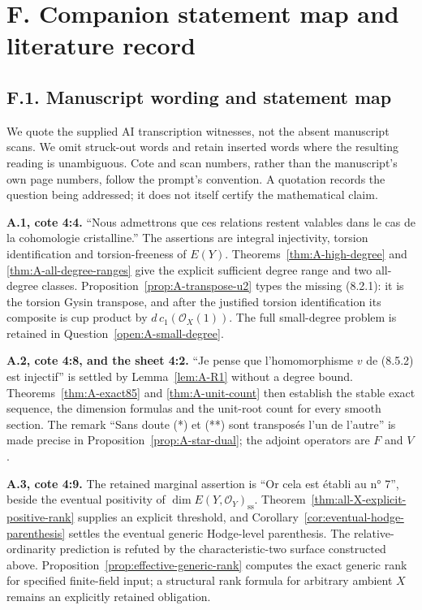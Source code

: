 \section{F. Companion statement map and literature record}
\subsection{F.1. Manuscript wording and statement map}
We quote the supplied AI transcription witnesses, not the absent manuscript
scans.  We omit struck-out words and retain inserted words where the resulting
reading is unambiguous.  Cote and scan numbers, rather than the manuscript's
own page numbers, follow the prompt's convention.  A quotation records the
question being addressed; it does not itself certify the mathematical claim.

\par\smallskip\noindent\textbf{A.1, cote 4:4.}
``Nous admettrons que ces relations restent valables dans le cas de la
cohomologie cristalline.''  The assertions are integral injectivity, torsion
identification and torsion-freeness of $E(Y)$.
Theorems~\ref{thm:A-high-degree} and \ref{thm:A-all-degree-ranges}
give the explicit sufficient degree range and two all-degree classes.
Proposition~\ref{prop:A-transpose-u2} types the missing (8.2.1): it is the
torsion Gysin transpose, and after the justified torsion identification its
composite is cup product by $d\,c_1(\mathcal O_X(1))$.
The full small-degree problem is retained in
Question~\ref{open:A-small-degree}.

\par\smallskip\noindent\textbf{A.2, cote 4:8, and the sheet 4:2.}
``Je pense que l'homomorphisme $v$ de (8.5.2) est injectif'' is settled by
Lemma~\ref{lem:A-R1} without a degree bound.
Theorems~\ref{thm:A-exact85} and \ref{thm:A-unit-count} then establish
the stable exact sequence, the dimension formulas and the unit-root count
for every smooth section.  The remark ``Sans doute (*) et (**) sont
transposés l'un de l'autre'' is made precise in
Proposition~\ref{prop:A-star-dual}; the adjoint operators are $F$ and $V$.

\par\smallskip\noindent\textbf{A.3, cote 4:9.}
The retained marginal assertion is ``Or cela est établi au n° 7'', beside
the eventual positivity of $\dim E(Y,\mathcal O_Y)_{\mathrm{ss}}$.
Theorem~\ref{thm:all-X-explicit-positive-rank} supplies an explicit
threshold, and Corollary~\ref{cor:eventual-hodge-parenthesis} settles
the eventual generic Hodge-level parenthesis.  The relative-ordinarity
prediction is refuted by the characteristic-two surface constructed above.
Proposition~\ref{prop:effective-generic-rank} computes the exact generic
rank for specified finite-field input; a structural rank formula for
arbitrary ambient $X$ remains an explicitly retained obligation.

